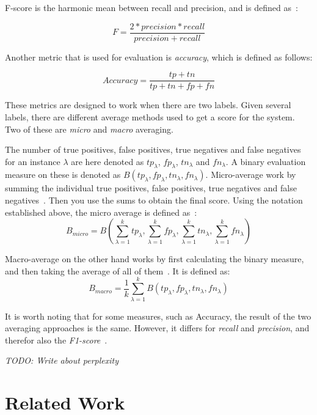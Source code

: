 F-score is the harmonic mean between recall and precision, and is defined as~\cite{tjong2003introduction}:

\begin{equation}
    F = \frac{2*precision*recall}{precision+recall}
\end{equation}

Another metric that is used for evaluation is \textit{accuracy}, which is defined as follows:

\begin{equation}
    Accuracy = \frac{tp+tn}{tp+tn+fp+fn}
\end{equation}

These metrics are designed to work when there are two labels.
Given several labels, there are different average methods used to get a score for the system.
Two of these are \textit{micro} and \textit{macro} averaging.

The number of true positives, false positives, true negatives and false negatives for an instance $\lambda$ are here denoted as $tp_\lambda$, $fp_\lambda$, $tn_\lambda$ and $fn_\lambda$.
A binary evaluation measure on these is denoted as $B(tp_\lambda, fp_\lambda, tn_\lambda, fn_\lambda)$.
Micro-average work by summing the individual true positives, false positives, true negatives and false negatives~\cite{tsoumakas2009mining}.
Then you use the sums to obtain the final score.
Using the notation established above, the micro average is defined as~\cite{tsoumakas2009mining}:
\begin{equation}
    B_{micro} = B(\sum_{\lambda = 1}^ktp_\lambda, \sum_{\lambda = 1}^kfp_\lambda, \sum_{\lambda = 1}^ktn_\lambda, \sum_{\lambda = 1}^kfn_\lambda)
\end{equation}

Macro-average on the other hand works by first calculating the binary measure, and then taking the average of all of them~\cite{tsoumakas2009mining}.
It is defined as:
\begin{equation}
    B_{macro} = \frac{1}{k}\sum_{\lambda = 1}^kB(tp_\lambda, fp_\lambda, tn_\lambda, fn_\lambda)
\end{equation}

It is worth noting that for some measures, such as Accuracy, the result of the two averaging approaches is the same.
However, it differs for \textit{recall} and \textit{precision}, and therefor also the \textit{F1-score}~\cite{tsoumakas2009mining}.

\textit{TODO: Write about perplexity}
\section{Related Work}

